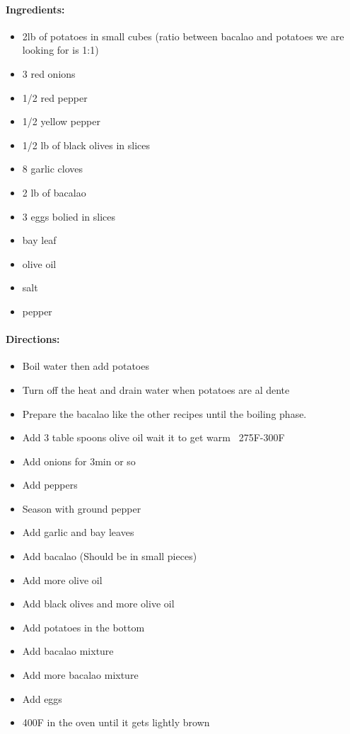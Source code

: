 \documentclass{article}
\begin{document}
\paragraph{Ingredients:}
\begin{itemize}
    \item 2lb of potatoes in small cubes (ratio between bacalao and potatoes we are looking for is 1:1)
    \item 3 red onions
    \item 1/2 red pepper
    \item 1/2 yellow pepper
    \item 1/2 lb of black olives in slices
    \item 8 garlic cloves
    \item 2 lb of bacalao
    \item 3 eggs bolied in slices
    \item bay leaf
    \item olive oil
    \item salt
    \item pepper
\end{itemize}

\paragraph{Directions:}
\begin{itemize}
    \item Boil water then add potatoes
    \item Turn off the heat and drain water when potatoes are al dente
    \item Prepare the bacalao like the other recipes until the boiling phase.
    \item Add 3 table spoons olive oil wait it to get warm ~275F-300F
    \item Add onions for 3min or so
    \item Add peppers
    \item Season with ground pepper
    \item Add garlic and bay leaves
    \item Add bacalao (Should be in small pieces)
    \item Add more olive oil
    \item Add black olives and more olive oil
    \item Add potatoes in the bottom
    \item Add bacalao mixture
    \item Add more bacalao mixture
    \item Add eggs
    \item 400F in the oven until it gets lightly brown
\end{itemize}
\end{document}

